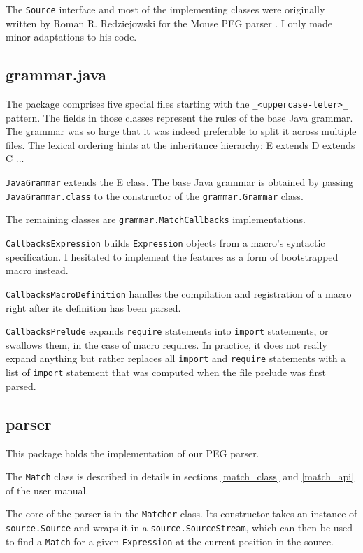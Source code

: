 The \texttt{Source} interface and most of the implementing classes were
originally written by Roman R. Redziejowski for the Mouse PEG parser
\cite{redziejowski2009}. I only made minor adaptations to his code.

\subsection{grammar.java}

The package comprises five special files starting with the
\texttt{_<uppercase-leter>_} pattern. The fields in those classes represent the
rules of the base Java grammar. The grammar was so large that it was indeed
preferable to split it across multiple files. The lexical ordering hints at the
inheritance hierarchy: E extends D extends C ...

\texttt{JavaGrammar} extends the E class. The base Java grammar is obtained by
passing \texttt{JavaGrammar.class} to the constructor of the
\texttt{grammar.Grammar} class.

The remaining classes are \texttt{grammar.MatchCallbacks} implementations.

\texttt{CallbacksExpression} builds \texttt{Expression} objects from a macro's
syntactic specification. I hesitated to implement the features as a form of
bootstrapped macro instead.

\texttt{CallbacksMacroDefinition} handles the compilation and registration of a
macro right after its definition has been parsed.

\texttt{CallbacksPrelude} expands \texttt{require} statements into
\texttt{import} statements, or swallows them, in the case of macro requires. In
practice, it does not really expand anything but rather replaces all
\texttt{import} and \texttt{require} statements with a list of \texttt{import}
statement that was computed when the file prelude was first parsed.

\subsection{parser}

This package holds the implementation of our PEG parser.

The \texttt{Match} class is described in details in sections \ref{match_class}
and \ref{match_api} of the user manual.

The core of the parser is in the \texttt{Matcher} class. Its constructor takes
an instance of \texttt{source.Source} and wraps it in a
\texttt{source.SourceStream}, which can then be used to find a \texttt{Match}
for a given \texttt{Expression} at the current position in the source.

